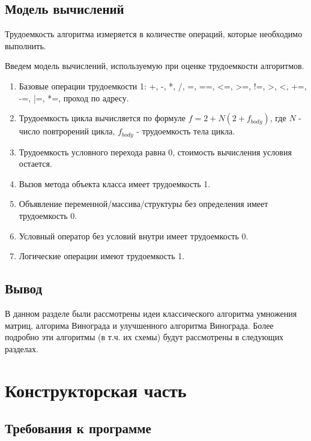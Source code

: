 \documentclass[a4paper,14pt]{report}
\begin{document}
\section*{Модель вычислений}

Трудоемкость алгоритма измеряется в количестве операций, которые необходимо выполнить.

Введем модель вычислений, используемую при оценке трудоемкости алгоритмов.

\begin{enumerate}
	\item Базовые операции трудоемкости 1: +, -, *, /, =, ==, <=, >=, !=, >, <, +=, -=, |=, *=, проход по адресу.
	\item Трудоемкость цикла вычисляется по формуле $f = 2 + N(2 + f_{body})$, где $N$ - число повтрорений цикла, $f_{body}$ - трудоемкость тела цикла.
	\item Трудоемкость условного перехода равна 0, стоимость вычисления условия остается.
	\item Вызов метода объекта класса имеет трудоемкость 1.
	\item Объявление переменной/массива/структуры без определения имеет трудоемкость 0.\
	\item Условный оператор без условий внутри имеет трудоемкость 0.
	\item Логические операции имеют трудоемкость 1.
\end{enumerate}

\section*{Вывод}
В данном разделе были рассмотрены идеи классического алгоритма умножения матриц, алгорима Винограда и улучшенного алгоритма Винограда. Более подробно эти алгоритмы (в т.ч. их схемы) будут рассмотрены в следующих разделах.

\chapter*{Конструкторская часть}

\section*{Требования к программе}
\end{document}
